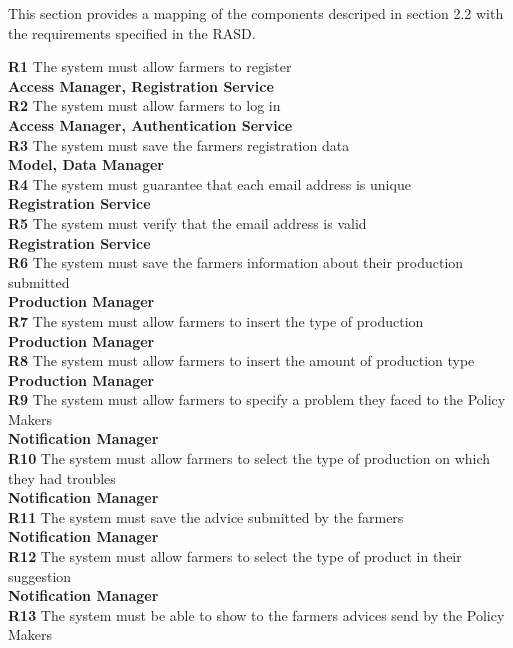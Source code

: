 This section provides a mapping of the components descriped in section 2.2 with the requirements specified in the RASD.

\noindent\textbf{R1} The system must allow farmers to register\\
\indent \textbf{Access Manager, Registration Service}\\
\textbf{R2} The system must allow farmers to log in\\
\indent \textbf{Access Manager, Authentication Service}\\
\textbf{R3} The system must save the farmers registration data\\
\indent \textbf{Model, Data Manager}\\
\textbf{R4} The system must guarantee that each email address is unique\\
\indent \textbf{Registration Service}\\
\textbf{R5} The system must verify that the email address is valid\\
\indent \textbf{Registration Service}\\
\textbf{R6} The system must save the farmers information about their production submitted\\
\indent \textbf{Production Manager}\\
\textbf{R7} The system must allow farmers to insert the type of production \\
\indent \textbf{Production Manager}\\
\textbf{R8} The system must allow farmers to insert the amount of production type\\
\indent \textbf{Production Manager}\\
\textbf{R9} The system must allow farmers to specify a problem they faced to the Policy Makers\\
\indent \textbf{Notification Manager}\\
\textbf{R10} The system must allow farmers to select the type of production on which they had troubles\\
\indent \textbf{Notification Manager}\\
\textbf{R11} The system must save the advice submitted by the farmers\\
\indent \textbf{Notification Manager}\\
\textbf{R12} The system must allow farmers to select the type of product in their suggestion\\
\indent \textbf{Notification Manager}\\
\textbf{R13} The system must be able to show to the farmers advices send by the Policy Makers\\

